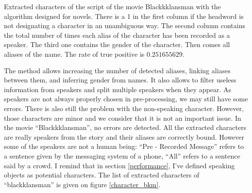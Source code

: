 \documentclass[a4paper, 12pt]{report}
\begin{document}
\begin{table}[]
\caption{Extracted characters of the script of the movie Blackkklansman with the algorithm designed for novels.
There is a 1 in the first column if the headword is not designating a character in an unambiguous way.
The second column contains the total number of times each alias of the character has been recorded as a speaker.
The third one contains the gender of the character. Then comes all aliases of the name. The rate of true positive is $0.251655629$.}
\label{bkk_nov}
\end{table}

The method allows increasing the number of detected aliases, linking aliases between them, and inferring gender from names.
It also allows to filter useless information from speakers and split multiple speakers when they appear.
As speakers are not always properly chosen in pre-processing, we may still have some errors.
There is also still the problem with the non-speaking character. However, those characters are minor and we consider that it is not an important issue.
In the movie ``Blackkklansman'', no errors are detected. All the extracted characters are really speakers from the story and their aliases are correctly bound.
However some of the speakers are not a human being: ``Pre - Recorded Message'' refers to a sentence given by the messaging system of a phone,
``All'' refers to a sentence said by a crowd. I remind that in section \ref{performance}, I've defined speaking objects as potential characters.
The list of extracted characters of ``blackklansman'' is given on figure \ref{character_bkm}.\\
\end{document}
